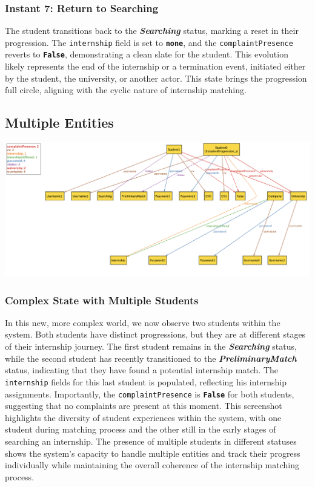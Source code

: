 \subsubsection*{Instant 7: Return to Searching}
The student transitions back to the \textbf{\textit{Searching}} status, marking a reset in their progression. The \texttt{internship} field is set to \textbf{\texttt{none}}, and the \texttt{complaintPresence} reverts to \textbf{\texttt{False}}, demonstrating a clean slate for the student. This evolution likely represents the end of the internship or a termination event, initiated either by the student, the university, or another actor. This state brings the progression full circle, aligning with the cyclic nature of internship matching.

\subsection{Multiple Entities}

\vspace{5mm}
\includegraphics[width=\textwidth]{complex.png}

\subsubsection*{Complex State with Multiple Students} In this new, more complex world, we now observe two students within the system. Both students have distinct progressions, but they are at different stages of their internship journey. The first student remains in the \textbf{\textit{Searching}} status, while the second student has recently transitioned to the \textbf{\textit{PreliminaryMatch}} status, indicating that they have found a potential internship match. The \texttt{internship} fields for this last student is populated, reflecting his internship assignments. Importantly, the \texttt{complaintPresence} is \textbf{\texttt{False}} for both students, suggesting that no complaints are present at this moment. This screenshot highlights the diversity of student experiences within the system, with one student during matching process and the other still in the early stages of searching an internship. The presence of multiple students in different statuses shows the system's capacity to handle multiple entities and track their progress individually while maintaining the overall coherence of the internship matching process.